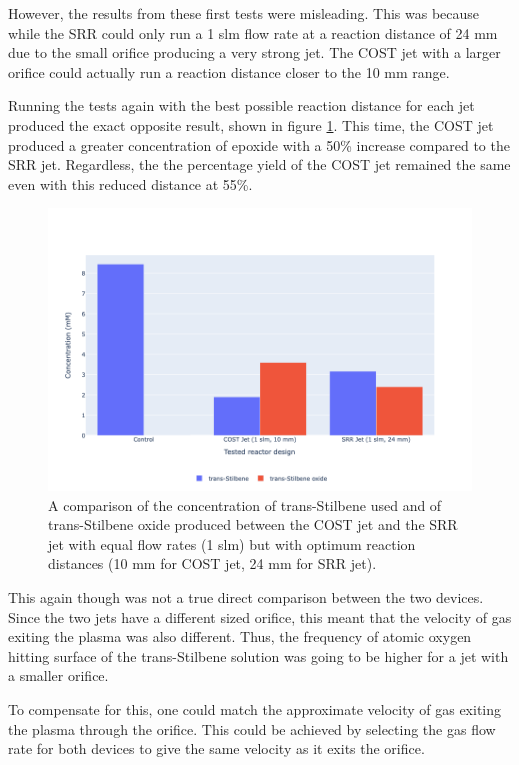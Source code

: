 However, the results from these first tests were misleading. This was because while the SRR could only run a 1 slm flow rate at a reaction distance of 24 mm due to the small orifice producing a very strong jet. The COST jet with a larger orifice could actually run a reaction distance closer to the 10 mm range. 

Running the tests again with the best possible reaction distance for each jet produced the exact opposite result, shown in figure \ref{fig:cost_jet_vs_srr_jet_5_mm_test}. This time, the COST jet produced a greater concentration of epoxide with a 50\% increase compared to the SRR jet. Regardless, the the percentage yield of the COST jet remained the same even with this reduced distance at 55\%. 

\begin{figure}[h!]
	\centering
    \includegraphics[width=\linewidth]{chapter_6/figures/cost_jet_vs_srr_jet_5_mm_test.png} 
	\caption{A comparison of the concentration of trans-Stilbene used and of trans-Stilbene oxide produced between the COST jet and the SRR jet with equal flow rates (1 slm) but with optimum reaction distances (10 mm for COST jet, 24 mm for SRR jet).}
	\label{fig:cost_jet_vs_srr_jet_5_mm_test}
\end{figure} 


This again though was not a true direct comparison between the two devices. Since the two jets have a different sized orifice, this meant that the velocity of gas exiting the plasma was also different. Thus, the frequency of atomic oxygen hitting surface of the trans-Stilbene solution was going to be higher for a jet with a smaller orifice.

To compensate for this, one could match the approximate velocity of gas exiting the plasma through the orifice. This could be achieved by selecting the gas flow rate for both devices to give the same velocity as it exits the orifice. 

